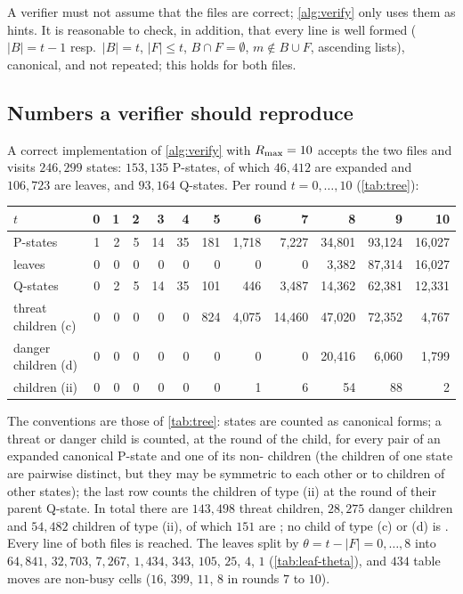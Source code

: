 A verifier must not assume that the files are correct; \cref{alg:verify} only uses them as hints. It is
reasonable to check, in addition, that every line is well formed ($|B|=t-1$ resp.\ $|B|=t$, $|F|\le t$,
$B\cap F=\emptyset$, $m\notin B\cup F$, ascending lists), canonical, and not repeated; this holds for both
files.

\subsection{Numbers a verifier should reproduce}\label{ssec:fmt-targets}

A correct implementation of \cref{alg:verify} with $R_{\max}=10$ accepts the two files and visits
$246{,}299$ states: $153{,}135$ P-states, of which $46{,}412$ are expanded and $106{,}723$ are leaves, and
$93{,}164$ Q-states. Per round $t=0,\dots,10$ (\cref{tab:tree}):
\begin{center}\footnotesize\setlength{\tabcolsep}{3.2pt}
\begin{tabular}{@{}lrrrrrrrrrrr@{}}
\toprule
$t$ & 0 & 1 & 2 & 3 & 4 & 5 & 6 & 7 & 8 & 9 & 10\\
\midrule
P-states & 1 & 2 & 5 & 14 & 35 & 181 & 1{,}718 & 7{,}227 & 34{,}801 & 93{,}124 & 16{,}027\\
leaves & 0 & 0 & 0 & 0 & 0 & 0 & 0 & 0 & 3{,}382 & 87{,}314 & 16{,}027\\
Q-states & 0 & 2 & 5 & 14 & 35 & 101 & 446 & 3{,}487 & 14{,}362 & 62{,}381 & 12{,}331\\
threat children (c) & 0 & 0 & 0 & 0 & 0 & 824 & 4{,}075 & 14{,}460 & 47{,}020 & 72{,}352 & 4{,}767\\
danger children (d) & 0 & 0 & 0 & 0 & 0 & 0 & 0 & 0 & 20{,}416 & 6{,}060 & 1{,}799\\
\VOID{} children (ii) & 0 & 0 & 0 & 0 & 0 & 0 & 1 & 6 & 54 & 88 & 2\\
\bottomrule
\end{tabular}
\end{center}
The conventions are those of \cref{tab:tree}: states are counted as canonical forms; a threat or danger
child is counted, at the round of the child, for every pair of an expanded canonical P-state and one of
its non-\VOID{} children (the children of one state are pairwise distinct, but they may be symmetric to
each other or to children of other states); the last row counts the \VOID{} children of type (ii) at the
round of their parent Q-state. In total there are $143{,}498$ threat children, $28{,}275$ danger children
and $54{,}482$ children of type (ii), of which $151$ are \VOID; no child of type (c) or (d) is \VOID. Every
line of both files is reached. The leaves split by $\theta=t-|F|=0,\dots,8$ into
$64{,}841$, $32{,}703$, $7{,}267$, $1{,}434$, $343$, $105$, $25$, $4$, $1$ (\cref{tab:leaf-theta}), and $434$ table moves are
non-busy cells ($16$, $399$, $11$, $8$ in rounds $7$ to $10$).

